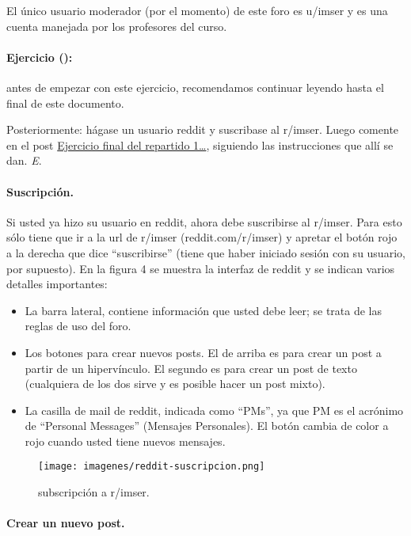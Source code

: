 \documentclass[]{article}
\makeatletter
\def\maxwidth{\ifdim\Gin@nat@width>\linewidth\linewidth
\else\Gin@nat@width\fi}
\let\Oldincludegraphics\includegraphics
\renewcommand{\includegraphics}[1]{\Oldincludegraphics[width=\maxwidth]{#1}}
\makeatother
\begin{document}
El único usuario moderador (por el momento) de este foro es u/imser y es
una cuenta manejada por los profesores del curso.

\paragraph{Ejercicio ():}

antes de empezar con este ejercicio, recomendamos continuar leyendo
hasta el final de este documento.

Posteriormente: hágase un usuario reddit y suscribase al r/imser. Luego
comente en el post
\href{http://www.reddit.com/r/imser/comments/1la8s8/ejercicio\_final\_del\_repartido\_1\_suscribirse\_a/}{Ejercicio
final del repartido 1\ldots{}}, siguiendo las instrucciones que allí se
dan. \emph{E}.

\paragraph{Suscripción.}

Si usted ya hizo su usuario en reddit, ahora debe suscribirse al
r/imser. Para esto sólo tiene que ir a la url de r/imser
(reddit.com/r/imser) y apretar el botón rojo a la derecha que dice
``suscribirse'' (tiene que haber iniciado sesión con su usuario, por
supuesto). En la figura 4 se muestra la interfaz de reddit y se indican
varios detalles importantes:

\begin{itemize}
\item
  La barra lateral, contiene información que usted debe leer; se trata
  de las reglas de uso del foro.
\item
  Los botones para crear nuevos posts. El de arriba es para crear un
  post a partir de un hipervínculo. El segundo es para crear un post de
  texto (cualquiera de los dos sirve y es posible hacer un post mixto).
\item
  La casilla de mail de reddit, indicada como ``PMs'', ya que PM es el
  acrónimo de ``Personal Messages'' (Mensajes Personales). El botón
  cambia de color a rojo cuando usted tiene nuevos mensajes.
\end{itemize}
\begin{figure}[htbp]
\centering
\texttt{[image: imagenes/reddit-suscripcion.png]}
\caption{subscripción a r/imser.}
\end{figure}

\paragraph{Crear un nuevo post.}
\end{document}
